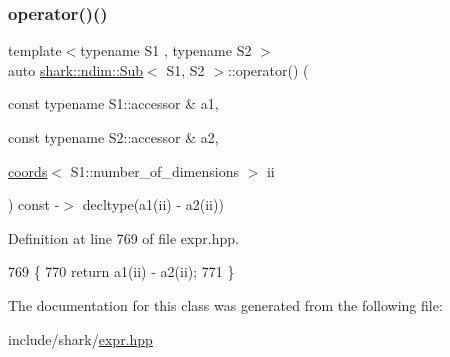 \subsubsection{\texorpdfstring{operator()()}{operator()()}}
{\footnotesize\ttfamily template$<$typename S1 , typename S2 $>$ \\
auto \hyperlink{classshark_1_1ndim_1_1_sub}{shark\+::ndim\+::\+Sub}$<$ S1, S2 $>$\+::operator() (\begin{DoxyParamCaption}\item[{const typename S1\+::accessor \&}]{a1,  }\item[{const typename S2\+::accessor \&}]{a2,  }\item[{\hyperlink{structshark_1_1ndim_1_1coords}{coords}$<$ S1\+::number\+\_\+of\+\_\+dimensions $>$}]{ii }\end{DoxyParamCaption}) const -\/$>$ decltype(a1(ii) -\/ a2(ii)) \hspace{0.3cm}{\ttfamily [inline]}}



Definition at line 769 of file expr.\+hpp.


\begin{DoxyCode}
769                                                                                                            
                                                           \{
770                 \textcolor{keywordflow}{return} a1(ii) - a2(ii);
771             \}
\end{DoxyCode}


The documentation for this class was generated from the following file\+:\begin{DoxyCompactItemize}
\item 
include/shark/\hyperlink{expr_8hpp}{expr.\+hpp}\end{DoxyCompactItemize}
